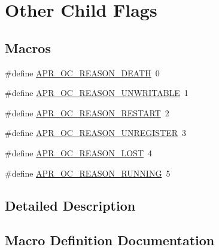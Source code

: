 \hypertarget{group___a_p_r___o_c}{}\section{Other Child Flags}
\label{group___a_p_r___o_c}
\subsection*{Macros}
\begin{DoxyCompactItemize}
\item 
\#define \mbox{\hyperlink{group___a_p_r___o_c_ga93a18b17cfedca0c7c99c696508c935b}{A\+P\+R\+\_\+\+O\+C\+\_\+\+R\+E\+A\+S\+O\+N\+\_\+\+D\+E\+A\+TH}}~0
\item 
\#define \mbox{\hyperlink{group___a_p_r___o_c_gae4cb4983512df7df00c9c0401efba9c9}{A\+P\+R\+\_\+\+O\+C\+\_\+\+R\+E\+A\+S\+O\+N\+\_\+\+U\+N\+W\+R\+I\+T\+A\+B\+LE}}~1
\item 
\#define \mbox{\hyperlink{group___a_p_r___o_c_ga5ae054b0b4c7c8eea911c146ae9ccdce}{A\+P\+R\+\_\+\+O\+C\+\_\+\+R\+E\+A\+S\+O\+N\+\_\+\+R\+E\+S\+T\+A\+RT}}~2
\item 
\#define \mbox{\hyperlink{group___a_p_r___o_c_ga7fe88662b788e07800290f68575b2f4b}{A\+P\+R\+\_\+\+O\+C\+\_\+\+R\+E\+A\+S\+O\+N\+\_\+\+U\+N\+R\+E\+G\+I\+S\+T\+ER}}~3
\item 
\#define \mbox{\hyperlink{group___a_p_r___o_c_ga5d441798b20b93bd1f609264d03690fb}{A\+P\+R\+\_\+\+O\+C\+\_\+\+R\+E\+A\+S\+O\+N\+\_\+\+L\+O\+ST}}~4
\item 
\#define \mbox{\hyperlink{group___a_p_r___o_c_gaa4a7ca44f23d67e7e19fd59bf41abd6a}{A\+P\+R\+\_\+\+O\+C\+\_\+\+R\+E\+A\+S\+O\+N\+\_\+\+R\+U\+N\+N\+I\+NG}}~5
\end{DoxyCompactItemize}


\subsection{Detailed Description}


\subsection{Macro Definition Documentation}
\mbox{\label{group___a_p_r___o_c_ga93a18b17cfedca0c7c99c696508c935b}} 
